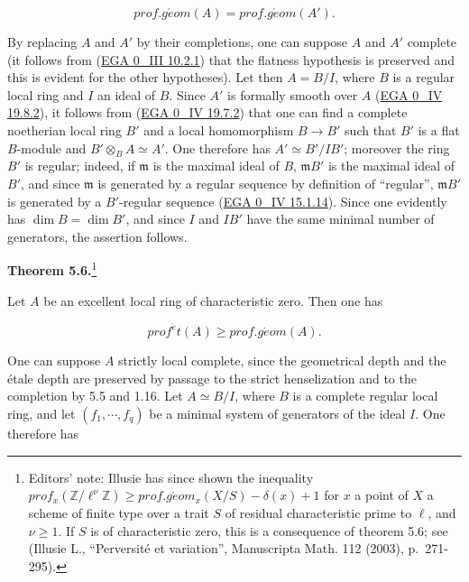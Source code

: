 \documentclass[
  11pt,
  a4paper,
]{book}
\begin{document}
\[ prof.g\acute{e}om(A) = prof.g\acute{e}om(A'). \]

By replacing \(A\) and \(A'\) by their completions, one can suppose
\(A\) and \(A'\) complete (it follows from
(\href{https://jcreinhold.github.io/ega/iii/03-ch0-10-complements-flat-modules.html\#102-local-criteria-of-flatness}{EGA
0\_III 10.2.1}) that the flatness hypothesis is preserved and this is
evident for the other hypotheses). Let then \(A = B/I\), where \(B\) is
a regular local ring and \(I\) an ideal of \(B\). Since \(A'\) is
formally smooth over \(A\)
(\href{https://jcreinhold.github.io/ega/iv/06-ch0-19-formally-smooth-algebras.html\#198-cohen-algebras-and-p-cohen-rings-application-to-the-structure-of-complete-local-rings}{EGA
0\_IV 19.8.2}), it follows from
(\href{https://jcreinhold.github.io/ega/iv/06-ch0-19-formally-smooth-algebras.html\#197-case-of-local-homomorphisms-existence-and-uniqueness-theorems}{EGA
0\_IV 19.7.2}) that one can find a complete noetherian local ring \(B'\)
and a local homomorphism \(B \to
B'\) such that \(B'\) is a flat \(B\)-module and
\(B' \otimes_{B} A \simeq A'\). One therefore has \(A' \simeq B'/IB'\);
moreover the ring \(B'\) is regular; indeed, if \(\mathfrak{m}\) is the
maximal ideal of \(B\), \(\mathfrak{m} B'\) is the maximal ideal of
\(B'\), and since \(\mathfrak{m}\) is generated by a regular sequence by
definition of ``regular'', \(\mathfrak{m} B'\) is generated by a
\(B'\)-regular sequence
(\href{https://jcreinhold.github.io/ega/iv/02-ch0-15-mf-regular-sequences.html\#151-m-regular-sequences-and-m-quasi-regular-sequences}{EGA
0\_IV 15.1.14}). Since one evidently has \(\dim B = \dim B'\), and since
\(I\) and \(IB'\) have the same minimal number of generators, the
assertion follows.

\textbf{Theorem 5.6.}\footnote{Editors' note: Illusie has since shown
  the inequality \(prof_{x}(\mathbb{Z}/\ell^{\nu} \mathbb{Z})
  \geqslant prof.g\acute{e}om_{x}(X/S) - \delta(x) + 1\) for \(x\) a
  point of \(X\) a scheme of finite type over a trait \(S\) of residual
  characteristic prime to \(\ell\), and \(\nu \geqslant 1\). If \(S\) is
  of characteristic zero, this is a consequence of theorem 5.6; see
  (Illusie L., ``Perversité et variation'', Manuscripta Math. 112
  (2003), p.~271-295).}

Let \(A\) be an excellent local ring of characteristic zero. Then one
has

\[ prof^{\acute{e}}t(A) \geqslant prof.g\acute{e}om(A). \]

One can suppose \(A\) strictly local complete, since the geometrical
depth and the étale depth are preserved by passage to the strict
henselization and to the completion by 5.5 and 1.16. Let
\(A \simeq B/I\), where \(B\) is a complete regular local ring, and let
\((f_{1}, \cdots, f_{q})\) be a minimal system of generators of the
ideal \(I\). One therefore has
\end{document}
